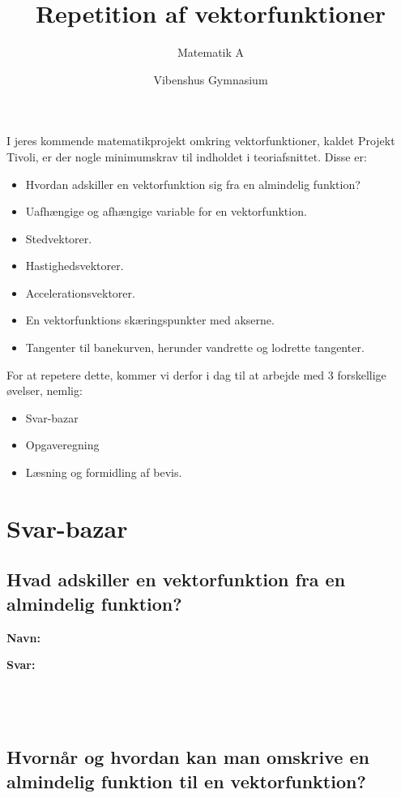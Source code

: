 \documentclass[a4paper, 12pt]{article}
\author{Matematik A}
\date{Vibenshus Gymnasium}
\title{Repetition af vektorfunktioner}
\begin{document}
\maketitle
I jeres kommende matematikprojekt omkring vektorfunktioner, kaldet Projekt Tivoli, er der nogle minimumskrav til indholdet i teoriafsnittet. Disse er:

\begin{itemize}
\item Hvordan adskiller en vektorfunktion sig fra en almindelig funktion?
\item Uafhængige og afhængige variable for en vektorfunktion.
\item Stedvektorer.
\item Hastighedsvektorer.
\item Accelerationsvektorer.
\item En vektorfunktions skæringspunkter med akserne.
\item Tangenter til banekurven, herunder vandrette og lodrette tangenter.
\end{itemize}

For at repetere dette, kommer vi derfor i dag til at arbejde med 3 forskellige øvelser, nemlig:

\begin{itemize}
\item Svar-bazar
\item Opgaveregning
\item Læsning og formidling af bevis.
\end{itemize}

\newpage

\section*{Svar-bazar}
\label{sec:orgecdd49b}

\subsection*{Hvad adskiller en vektorfunktion fra en almindelig funktion?}
\label{sec:org8bb444a}

\textbf{Navn:}

\textbf{Svar:}

$$\phantom{a}$$

$$\phantom{a}$$

$$\phantom{a}$$

\subsection*{Hvornår og hvordan kan man omskrive en almindelig funktion til en vektorfunktion?}
\label{sec:org2bf4897}
\end{document}
